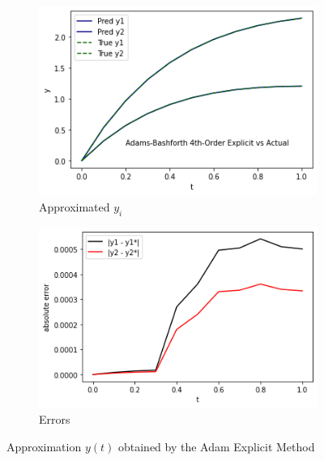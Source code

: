 \documentclass[12pt,oneside]{book}
\begin{document}
		\begin{figure}[h!]
			\centering
			\begin{subfigure}[h]{0.47\textwidth}
				\centering
				\includegraphics[width=\textwidth]{aexp}
				\caption{Approximated $ y_{i} $}
			\end{subfigure}
			\hfill
			\begin{subfigure}[h]{0.47\textwidth}
				\centering
				\includegraphics[width=\textwidth]{aexp_err}
				\caption{Errors}
			\end{subfigure}
			\caption{Approximation $ y(t) $ obtained by the Adam Explicit Method}
			\label{fig:aexp}
		\end{figure}
	
\end{document}

